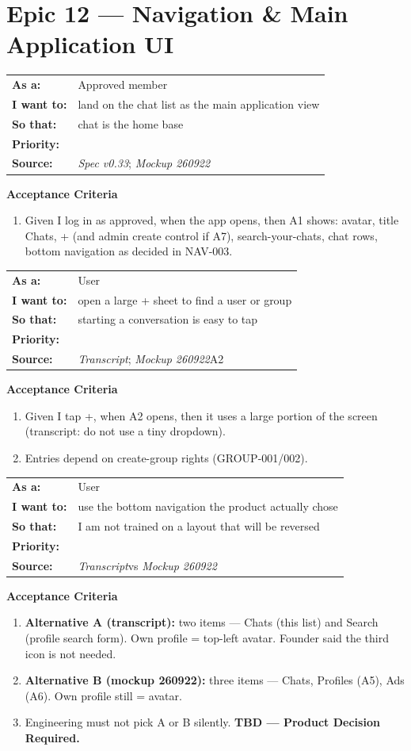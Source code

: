 \documentclass[11pt,a4paper]{article}
\makeatletter
\newcommand{\priPzero}{\colorbox{p0}{\makebox[4.6em]{\textcolor{white}{\scriptsize\bfseries P0 V1}}}}
\newcommand{\priTBD}{\colorbox{tbd}{\makebox[4.6em]{\textcolor{white}{\scriptsize\bfseries TBD}}}}
\newcommand{\srcSpec}{\textit{Spec v0.33}}
\newcommand{\srcTx}{\textit{Transcript}}
\newcommand{\srcMock}{\textit{Mockup 260922}}
\newenvironment{story}[1]{%
  \Needspace{10\baselineskip}%
  \vspace{0.7em}%
  \noindent
  \colorbox{navy}{\makebox[\dimexpr\textwidth-2\fboxsep\relax][l]{\textcolor{white}{\bfseries\ #1}}}%
  \par\vspace{0.35em}%
}{\par\vspace{0.55em}}
\newcommand{\storymeta}[5]{%
  \noindent
  \begin{tabularx}{\textwidth}{@{}>{\bfseries}l X@{}}
    As a: & #1 \\
    I want to: & #2 \\
    So that: & #3 \\
    Priority: & #4 \\
    Source: & #5 \\
  \end{tabularx}
  \par\vspace{0.3em}
}
\newcommand{\achead}{\noindent\textbf{Acceptance Criteria}\par}
\makeatother
\begin{document}
\section{Epic 12 --- Navigation \& Main Application UI}

\begin{story}{NAV-001 --- Main screen A1 as home after approval}
\storymeta{Approved member}{land on the chat list as the main application view}{chat is the home base}{\priPzero}{\srcSpec; \srcMock}
\achead
\begin{enumerate}
  \item Given I log in as approved, when the app opens, then A1 shows: avatar, title Chats, + (and admin create control if A7), search-your-chats, chat rows, bottom navigation as decided in NAV-003.
\end{enumerate}
\end{story}

\begin{story}{NAV-002 --- Plus opens join-chat search (full-screen)}
\storymeta{User}{open a large + sheet to find a user or group}{starting a conversation is easy to tap}{\priPzero}{\srcTx; \srcMock A2}
\achead
\begin{enumerate}
  \item Given I tap +, when A2 opens, then it uses a large portion of the screen (transcript: do not use a tiny dropdown).
  \item Entries depend on create-group rights (GROUP-001/002).
\end{enumerate}
\end{story}

\begin{story}{NAV-003 --- Bottom navigation structure (conflict)}
\storymeta{User}{use the bottom navigation the product actually chose}{I am not trained on a layout that will be reversed}{\priTBD}{\srcTx vs \srcMock}
\achead
\begin{enumerate}
  \item \textbf{Alternative A (transcript):} two items --- Chats (this list) and Search (profile search form). Own profile = top-left avatar. Founder said the third icon is not needed.
  \item \textbf{Alternative B (mockup 260922):} three items --- Chats, Profiles (A5), Ads (A6). Own profile still = avatar.
  \item Engineering must not pick A or B silently. \textbf{TBD --- Product Decision Required.}
\end{enumerate}
\end{story}
\end{document}
